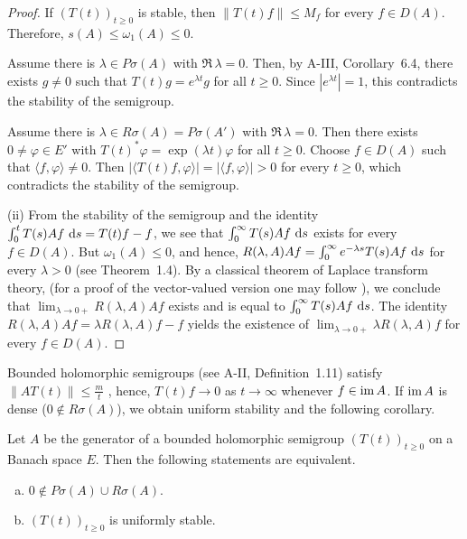 \begin{proof} If $ (T(t))_{t \geq 0} $ is stable, then $ \|T(t) f\| \leq M_f $ for every $ f \in D(A) $. Therefore, $ s(A) \leq \omega_1(A) \leq 0 $. 

 Assume there is $ \lambda \in P\sigma(A) $ with $ \Re\,\lambda = 0 $. Then, by A-III, Corollary~6.4, there exists $ g \neq 0 $ such that $ T(t) g = e^{\lambda t} g $ for all $ t \geq 0 $. Since $ |e^{\lambda t}| = 1 $, this contradicts the stability of the semigroup. 

 Assume there is $ \lambda \in R\sigma(A) = P\sigma(A') $ with $ \Re\,\lambda = 0 $. Then there exists $ 0 \neq \varphi \in E' $ with $ T(t)^* \varphi = \exp(\lambda t) \varphi $ for all $ t \geq 0 $. Choose $ f \in D(A) $ such that $ \langle f, \varphi \rangle \neq 0 $. Then $ |\langle T(t) f, \varphi \rangle| = | \langle f, \varphi \rangle| > 0 $ for every $ t \geq 0 $, which contradicts the stability of the semigroup.


(ii) From the stability of the semigroup and the identity   $\int_{0}^{t} T(s) A f \,\mathop{}\!\mathrm{d}{s} = T(t) f - f$, we see that  
$\int_{0}^{\infty} T(s) A f \,\mathop{}\!\mathrm{d}{s}$ exists for every $ f \in D(A) $.  
But $ \omega_1(A) \leq 0 $, and hence,  
$ R(\lambda, A) A f = \int_{0}^{\infty} e^{-\lambda s} T(s) A f \,\mathop{}\!\mathrm{d}{s} $ for every $ \lambda > 0 $ (see Theorem~1.4). By a classical theorem of Laplace transform theory, (for a proof of the vector-valued version one may follow \citet[p.196]{widder:1971}), we conclude that $\lim_{\lambda \to 0+} R(\lambda,A)Af$ exists
and is equal to $\int_{0}^{\infty} T(s)Af \,\mathop{}\!\mathrm{d}{s}$. 
The identity $R(\lambda,A)Af = \lambda R(\lambda,A)f - f$
yields the existence of $\lim_{\lambda \to 0+} \lambda R(\lambda,A)f$ for every $f \in D(A)$.
\end{proof}

Bounded holomorphic semigroups (see A-II, Definition~1.11) satisfy
$\|AT(t)\| \leq \frac{m}{t}$ \citet[p.33]{goldstein:1985a}, hence, $T(t)f \to 0$ as $t \to \infty$
whenever $f \in \mathop{}\!\mathrm{im}\, A$. 
If $\mathop{}\!\mathrm{im}\, A$ is dense (\ie $0 \not\in R\sigma(A)$), we obtain
uniform stability and the following corollary.

\begin{corollary}\label{cor:a4-1.14}
Let $A$ be the generator of a bounded holomorphic
semigroup $(T(t))_{t \geq 0}$ on a Banach space $E$. 
Then the following statements are equivalent.
\begin{enumerate}[(a)]
\item $0 \not\in P\sigma(A) \cup R\sigma(A)$.
\item $(T(t))_{t \geq 0}$ is uniformly stable.
\end{enumerate}
\end{corollary}

